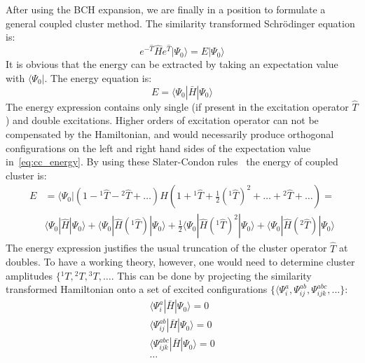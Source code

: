 After using the BCH expansion, we are finally in a position to formulate a 
general coupled cluster method. The similarity transformed Schr{\"o}dinger 
equation is:
%
\begin{equation}
 e^{-\hat{T}} \hat{H} e^{\hat{T}} |\Psi_{0}\rangle = E |\Psi_{0}\rangle
 \label{eq:sim_cc_schroedinger}
\end{equation}
It is obvious that the energy can be extracted by taking an expectation value 
with $\langle \Psi_{0}|$. The energy equation is:
%
\begin{equation}
 E = \langle \Psi_{0} | \bar{H} | \Psi_{0} \rangle
 \label{eq:cc_energy}
\end{equation}
The energy expression contains only single (if present in the excitation 
operator $\hat{T}$) and double excitations. Higher orders of 
excitation operator can not be compensated by the Hamiltonian, and would 
necessarily produce orthogonal configurations on the left and right hand sides 
of the expectation value in~\ref{eq:cc_energy}. By using these Slater-Condon 
rules~\cite{jensen2017introduction} the energy of coupled cluster is:
%
\begin{equation}
\begin{aligned}
 E &= \langle \Psi_{0} | (1 - {}^{1}\hat{T} - {}^{2}\hat{T} + \ldots) H (1 + 
{}^{1}\hat{T} + \frac{1}{2} ({}^{1}\hat{T})^2 + \ldots + {}^2 \hat{T} + \ldots) 
= \\
& \langle \Psi_{0} | \hat{H} | \Psi_{0} \rangle + \langle \Psi_{0} | \hat{H} 
({}^{1}\hat{T})| 
\Psi_{0} \rangle + \frac{1}{2} \langle \Psi_{0} | \hat{H} ({}^{1}\hat{T})^2 | 
\Psi_{0} 
\rangle + \langle \Psi_{0} | \hat{H} ({}^{2} \hat{T})| \Psi_{0} \rangle
\end{aligned}
\end{equation}
%
The energy expression justifies the usual truncation of the cluster operator 
$\hat{T}$ at doubles. To have a working theory, however, one would need to 
determine cluster amplitudes $\{{}^{1}T, {}^{2}T, {}^{3}T, \ldots$. This can be 
done by projecting the similarity transformed Hamiltonian onto a set of excited 
configurations $\{ \langle \Psi_{i}^{a}, \Psi_{ij}^{ab}, \Psi_{ijk}^{abc}, 
\ldots \}$: 
%
\begin{equation}
\begin{aligned}
 \langle{\Psi_{i}^{a}} | \bar{H} | \Psi_{0} \rangle = 0 \\
 \langle{\Psi_{ij}^{ab}} | \bar{H} | \Psi_{0} \rangle = 0  \\
 \langle{\Psi_{ijk}^{abc}} | \bar{H} | \Psi_{0} \rangle = 0 \\
 \ldots
\end{aligned}
\label{eq:residuals}
\end{equation}
